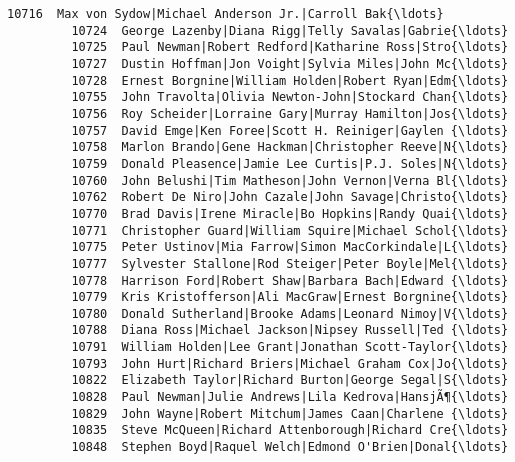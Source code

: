 \documentclass[11pt]{article}
\begin{document}
\begin{Verbatim}[commandchars=\\\{\}]
         10716  Max von Sydow|Michael Anderson Jr.|Carroll Bak{\ldots}   
         10724  George Lazenby|Diana Rigg|Telly Savalas|Gabrie{\ldots}   
         10725  Paul Newman|Robert Redford|Katharine Ross|Stro{\ldots}   
         10727  Dustin Hoffman|Jon Voight|Sylvia Miles|John Mc{\ldots}   
         10728  Ernest Borgnine|William Holden|Robert Ryan|Edm{\ldots}   
         10755  John Travolta|Olivia Newton-John|Stockard Chan{\ldots}   
         10756  Roy Scheider|Lorraine Gary|Murray Hamilton|Jos{\ldots}   
         10757  David Emge|Ken Foree|Scott H. Reiniger|Gaylen {\ldots}   
         10758  Marlon Brando|Gene Hackman|Christopher Reeve|N{\ldots}   
         10759  Donald Pleasence|Jamie Lee Curtis|P.J. Soles|N{\ldots}   
         10760  John Belushi|Tim Matheson|John Vernon|Verna Bl{\ldots}   
         10762  Robert De Niro|John Cazale|John Savage|Christo{\ldots}   
         10770  Brad Davis|Irene Miracle|Bo Hopkins|Randy Quai{\ldots}   
         10771  Christopher Guard|William Squire|Michael Schol{\ldots}   
         10775  Peter Ustinov|Mia Farrow|Simon MacCorkindale|L{\ldots}   
         10777  Sylvester Stallone|Rod Steiger|Peter Boyle|Mel{\ldots}   
         10778  Harrison Ford|Robert Shaw|Barbara Bach|Edward {\ldots}   
         10779  Kris Kristofferson|Ali MacGraw|Ernest Borgnine{\ldots}   
         10780  Donald Sutherland|Brooke Adams|Leonard Nimoy|V{\ldots}   
         10788  Diana Ross|Michael Jackson|Nipsey Russell|Ted {\ldots}   
         10791  William Holden|Lee Grant|Jonathan Scott-Taylor{\ldots}   
         10793  John Hurt|Richard Briers|Michael Graham Cox|Jo{\ldots}   
         10822  Elizabeth Taylor|Richard Burton|George Segal|S{\ldots}   
         10828  Paul Newman|Julie Andrews|Lila Kedrova|HansjÃ¶{\ldots}   
         10829  John Wayne|Robert Mitchum|James Caan|Charlene {\ldots}   
         10835  Steve McQueen|Richard Attenborough|Richard Cre{\ldots}   
         10848  Stephen Boyd|Raquel Welch|Edmond O'Brien|Donal{\ldots}   
         

\end{Verbatim}
\end{document}
